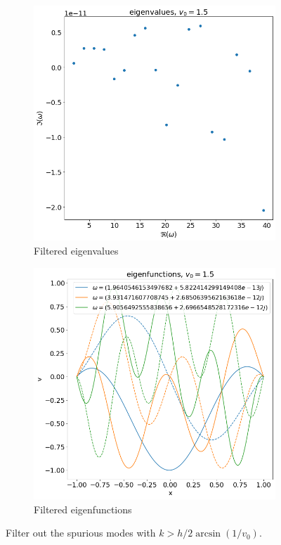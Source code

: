 \documentclass{article}
\begin{document}
\begin{figure}[H]
    \centering
    \begin{subfigure}[b]{0.5\linewidth}
        \includegraphics[width=\linewidth]{img/eigvals-G-filtered.png} 
        \caption{Filtered eigenvalues}
        \label{fig:results-G-a}
    \end{subfigure}%
    \begin{subfigure}[b]{0.5\linewidth}
        \includegraphics[width=\linewidth]{img/eigfuncs-G-filtered.png} 
        \caption{Filtered eigenfunctions}
        \label{fig:results-G-b}
    \end{subfigure}
    \caption{Filter out the spurious modes with $k>h/2\arcsin(1/v_0)$.}
    \label{fig:results-G}
\end{figure}
\end{document}
